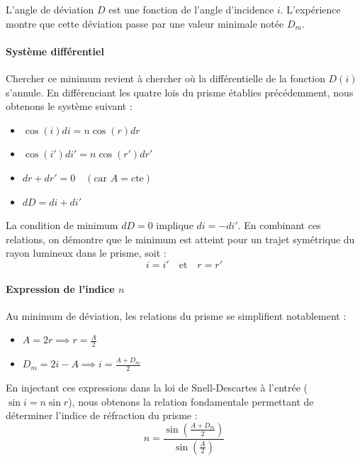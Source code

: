 L'angle de déviation $D$ est une fonction de l'angle d'incidence $i$. L'expérience montre que cette déviation passe par une valeur minimale notée $D_m$. 

\paragraph{Système différentiel}
Chercher ce minimum revient à chercher où la différentielle de la fonction $D(i)$ s'annule. En différenciant les quatre lois du prisme établies précédemment, nous obtenons le système suivant :
\begin{itemize}
    \item $\cos(i)di = n \cos(r)dr$
    \item $\cos(i')di' = n \cos(r')dr'$
    \item $dr + dr' = 0 \quad (\text{car } A = \text{cte})$
    \item $dD = di + di'$
\end{itemize}

La condition de minimum $dD = 0$ implique $di = -di'$. En combinant ces relations, on démontre que le minimum est atteint pour un trajet symétrique du rayon lumineux dans le prisme, soit :
\begin{equation}
    i = i' \quad \text{et} \quad r = r'
\end{equation}

\paragraph{Expression de l'indice $n$}
Au minimum de déviation, les relations du prisme se simplifient notablement :
\begin{itemize}
    \item $A = 2r \implies r = \frac{A}{2}$
    \item $D_m = 2i - A \implies i = \frac{A + D_m}{2}$
\end{itemize}

En injectant ces expressions dans la loi de Snell-Descartes à l'entrée ($\sin i = n \sin r$), nous obtenons la relation fondamentale permettant de déterminer l'indice de réfraction du prisme :
\begin{equation}
    n = \frac{\sin\left(\frac{A + D_m}{2}\right)}{\sin\left(\frac{A}{2}\right)}
    \label{eq:formule_n}
\end{equation}